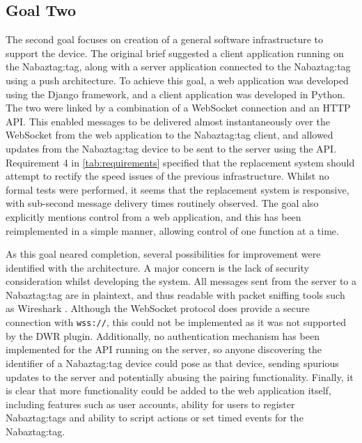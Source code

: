 \documentclass[12pt, a4paper]{article}
\begin{document}
	\subsection{Goal Two}
	The second goal focuses on creation of a general software infrastructure to support the device. The original brief suggested a client application running on the Nabaztag:tag, along with a server application connected to the Nabaztag:tag using a push architecture. To achieve this goal, a web application was developed using the Django framework, and a client application was developed in Python. The two were linked by a combination of a WebSocket connection and an \ac{HTTP} \ac{API}. This enabled messages to be delivered almost instantaneously over the WebSocket from the web application to the Nabaztag:tag client, and allowed updates from the Nabaztag:tag device to be sent to the server using the \ac{API}. Requirement 4 in \autoref{tab:requirements} specified that the replacement system should attempt to rectify the speed issues of the previous infrastructure. Whilst no formal tests were performed, it seems that the replacement system is responsive, with sub-second message delivery times routinely observed. The goal also explicitly mentions control from a web application, and this has been reimplemented in a simple manner, allowing control of one function at a time. 
	
	As this goal neared completion, several possibilities for improvement were identified with the architecture. A major concern is the lack of security consideration whilst developing the system. All messages sent from the server to a Nabaztag:tag are in plaintext, and thus readable with packet sniffing tools such as Wireshark \parencite{wireshark}. Although the WebSocket protocol does provide a secure connection with \verb+wss://+, this could not be implemented as it was not supported by the \ac{DWR} plugin. Additionally, no authentication mechanism has been implemented for the \ac{API} running on the server, so anyone discovering the identifier of a Nabaztag:tag device could pose as that device, sending spurious updates to the server and potentially abusing the pairing functionality. Finally, it is clear that more functionality could be added to the web application itself, including features such as user accounts, ability for users to register Nabaztag:tags and ability to script actions or set timed events for the Nabaztag:tag.
	
\end{document}
